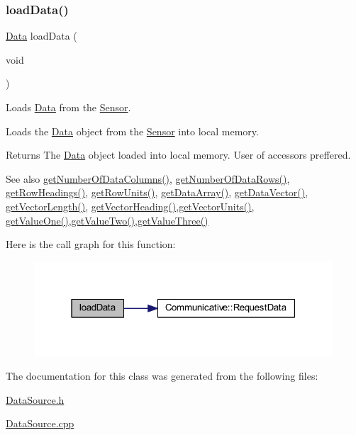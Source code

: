 \subsubsection{\texorpdfstring{loadData()}{loadData()}}
{\footnotesize\ttfamily \mbox{\hyperlink{struct_data}{Data}} load\+Data (\begin{DoxyParamCaption}\item[{void}]{ }\end{DoxyParamCaption})}



Loads \mbox{\hyperlink{struct_data}{Data}} from the \mbox{\hyperlink{class_sensor}{Sensor}}. 

Loads the \mbox{\hyperlink{struct_data}{Data}} object from the \mbox{\hyperlink{class_sensor}{Sensor}} into local memory. \begin{DoxyReturn}{Returns}
The \mbox{\hyperlink{struct_data}{Data}} object loaded into local memory. User of accessors preffered. 
\end{DoxyReturn}
\begin{DoxySeeAlso}{See also}
\mbox{\hyperlink{class_data_source_ac15f241362d7c22c75c42c2bb16315bf}{get\+Number\+Of\+Data\+Columns()}}, \mbox{\hyperlink{class_data_source_a52269fa43b741f1ab431aac56d3aedb5}{get\+Number\+Of\+Data\+Rows()}}, \mbox{\hyperlink{class_data_source_acdeb2ae03f2c70d19565381d111a1a4d}{get\+Row\+Headings()}}, \mbox{\hyperlink{class_data_source_abf7e2f4954b1c314fba8f0ac3194306e}{get\+Row\+Units()}}, \mbox{\hyperlink{class_data_source_a83bdf3c6a0c54d468dad3e73509c90e6}{get\+Data\+Array()}}, \mbox{\hyperlink{class_data_source_a924875bd657b56f140604551270cdbc0}{get\+Data\+Vector()}}, \mbox{\hyperlink{class_data_source_a49998f22c00d924daf7b67af48e10a30}{get\+Vector\+Length()}}, \mbox{\hyperlink{class_data_source_a79d69573a651290750aa8c08d24f3b64}{get\+Vector\+Heading()}},\mbox{\hyperlink{class_data_source_af2a2f33b9970ecff75894134498ff2cd}{get\+Vector\+Units()}}, \mbox{\hyperlink{class_data_source_ac70e056b629dd62379c42af3e6ca6b1b}{get\+Value\+One()}},\mbox{\hyperlink{class_data_source_accbfa79e7afee154b4332483181f27ec}{get\+Value\+Two()}},\mbox{\hyperlink{class_data_source_ad7870f61cbf33ac7a284b47930ff5bcf}{get\+Value\+Three()}} 
\end{DoxySeeAlso}
Here is the call graph for this function\+:
\nopagebreak
\begin{figure}[H]
\begin{center}
\leavevmode
\includegraphics[width=316pt]{class_data_source_a81aac807bfb601c2ac1da78f69d31d48_cgraph}
\end{center}
\end{figure}


The documentation for this class was generated from the following files\+:\begin{DoxyCompactItemize}
\item 
\mbox{\hyperlink{_data_source_8h}{Data\+Source.\+h}}\item 
\mbox{\hyperlink{_data_source_8cpp}{Data\+Source.\+cpp}}\end{DoxyCompactItemize}
